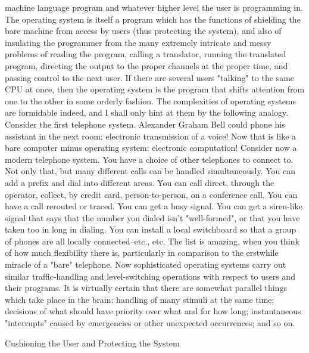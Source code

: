       machine language program and whatever higher level the user is programming in.
       The operating system is itself a program which has the functions of shielding the
       bare machine from access by users (thus protecting the system), and also of
       insulating the programmer from the many extremely intricate and messy problems
       of reading the program, calling a translator, running the translated program,
       directing the output to the proper channels at the proper time, and passing control
       to the next user. If there are several users "talking" to the same CPU at once, then
       the operating system is the program that shifts attention from one to the other in
       some orderly fashion. The complexities of operating systems are formidable
       indeed, and I shall only hint at them by the following analogy.
               Consider the first telephone system. Alexander Graham Bell could phone
       his assistant in the next room: electronic transmission of a voice! Now that is like
       a bare computer minus operating system: electronic computation! Consider now a
       modern telephone system. You have a choice of other telephones to connect to.
       Not only that, but many different calls can be handled simultaneously. You can
       add a prefix and dial into different areas. You can call direct, through the
       operator, collect, by credit card, person-to-person, on a conference call. You can
       have a call rerouted or traced. You can get a busy signal. You can get a siren-like
       signal that says that the number you dialed isn't "well-formed", or that you have
       taken too in long in dialing. You can install a local switchboard so that a group of
       phones are all locally connected--etc., etc. The list is amazing, when you think of
       how much flexibility there is, particularly in comparison to the erstwhile miracle
       of a "bare" telephone. Now sophisticated operating systems carry out similar
       traffic-handling and level-switching operations with respect to users and their
       programs. It is virtually certain that there are somewhat parallel things which take
       place in the brain: handling of many stimuli at the same time; decisions of what
       should have priority over what and for how long; instantaneous "interrupts"
       caused by emergencies or other unexpected occurrences; and so on.

                       Cushioning the User and Protecting the System

